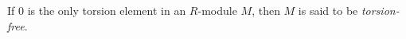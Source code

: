 If $0$ is the only torsion element in an $R$-module $M$, then $M$ is said to be \emph{torsion-free}.
